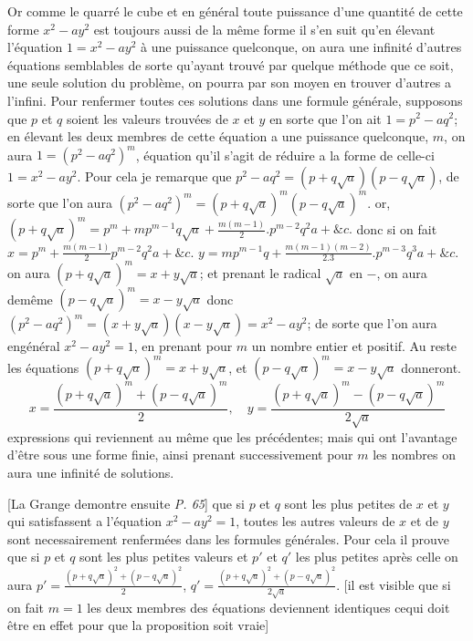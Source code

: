 \documentclass[11pt,a4paper]{article}
\begin{document}
Or comme le quarré le cube  et en général toute puissance d'une quantité de cette forme
$x^{2} - ay^{2}$ est toujours aussi de la même forme il s'en suit qu'en élevant l'équation
$1 = x^{2} - ay^{2}$ à une puissance quelconque, on aura une infinité d'autres équations semblables
de sorte qu'ayant trouvé par quelque méthode que ce soit, une seule solution du
problème, on pourra par son moyen en trouver d'autres a l'infini.
Pour renfermer toutes ces solutions dans une formule générale, supposons que
$p$ et $q$ soient les valeurs trouvées de $x$ et $y$ en sorte que l'on ait $1 = p^{2} - aq^{2}$; en élevant les
deux membres de cette équation a une puissance quelconque, $m$, on aura $1 = (p^{2} - aq^{2})^{m}$,
équation qu'il s'agit de réduire a la forme de celle-ci $1 = x^{2} - ay^{2}$.
Pour cela je remarque que $p^{2} - aq^{2} = (p + q\sqrt{a})(p - q\sqrt{a})$, de sorte que l'on aura
$(p^{2} - aq^{2})^{m} = (p + q\sqrt{a})^{m}(p - q\sqrt{a})^{m}$. or, $(p + q\sqrt{a})^{m} = p^{m} + mp^{m-1}q\sqrt{a} + \frac{m(m-1)}{2}.p^{m-2}q^{2}a + \&c.$
donc si on fait $x = p^{m} + \frac{m(m-1)}{2}p^{m-2}q^{2}a + \&c.$ \quad $y = mp^{m-1}q + \frac{m(m-1)(m-2)}{2.3}.p^{m-3}q^{3}a + \&c.$
on aura $(p + q\sqrt{a})^{m} = x + y\sqrt{a}$; et prenant le radical $\sqrt{a}$ en $-$, on aura demême
$(p - q\sqrt{a})^{m} = x - y\sqrt{a}$ donc $(p^{2} - aq^{2})^{m} = (x + y\sqrt{a})(x - y\sqrt{a}) = x^{2} - ay^{2}$; de sorte que l'on aura
engénéral $x^{2} - ay^{2} = 1$, en prenant pour $m$ un nombre entier et positif.
Au reste les équations $(p + q\sqrt{a})^{m} = x + y\sqrt{a}$, et $(p - q\sqrt{a})^{m} = x - y\sqrt{a}$ donneront.
\[ x = \frac{(p + q\sqrt{a})^{m} + (p - q\sqrt{a})^{m}}{2}, \quad y = \frac{(p + q\sqrt{a})^{m} - (p - q\sqrt{a})^{m}}{2\sqrt{a}} \]
expressions qui reviennent au même que les précédentes; mais qui ont l'avantage d'être sous une forme
finie, ainsi prenant successivement pour $m$  les nombres \struck{\ill{}}  on aura une infinité de solutions.

[La Grange demontre ensuite \emph{P. 65}] que si $p$ et \struck{\ill{}} $q$ sont les plus petites de $x$ et $y$ qui satisfassent
a l'équation $x^{2} - ay^{2} = 1$, toutes les autres valeurs de $x$ et de $y$ sont necessairement renfermées
dans les formules générales. Pour cela il prouve que si $p$ et $q$ sont les plus petites valeurs et
$p'$ et $q'$  les plus petites après celle on aura \quad $p' = \frac{(p + q\sqrt{a})^{2} + (p - q\sqrt{a})^{2}}{2}$, $q' = \frac{(p + q\sqrt{a})^{2} + (p - q\sqrt{a})^{2}}{2\sqrt{a}}$.
[il est visible que si on fait $m = 1$ les deux membres des équations deviennent identiques cequi  doit
être en effet pour que la proposition soit vraie]
\end{document}
